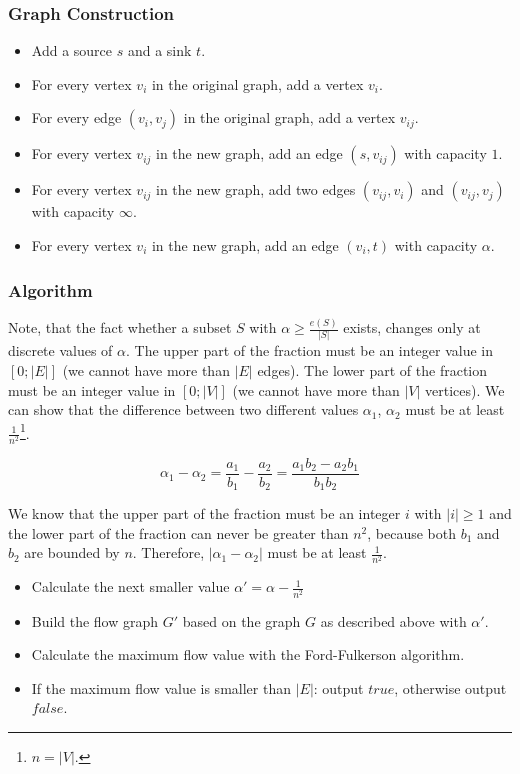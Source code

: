 \documentclass[12pt]{article}
\begin{document}
\subsubsection*{Graph Construction}
\begin{itemize}
	\item Add a source $s$ and a sink $t$.
	\item For every vertex $v_i$ in the original graph, add a vertex $v_i$.
	\item For every edge $(v_i, v_j)$ in the original graph, add a vertex $v_{ij}$.
	\item For every vertex $v_{ij}$ in the new graph, add an edge $(s, v_{ij})$ with capacity $1$.
	\item For every vertex $v_{ij}$ in the new graph, add two edges $(v_{ij}, v_i)$ and $(v_{ij}, v_j)$ with capacity $\infty$.
	\item For every vertex $v_i$ in the new graph, add an edge $(v_i, t)$ with capacity $\alpha$.
\end{itemize}

\subsubsection*{Algorithm}
Note, that the fact whether a subset $S$ with $\alpha \geq \frac{e(S)}{|S|}$ exists, changes only at discrete values of $\alpha$. The upper part of the fraction must be an integer value in $[0; |E|]$ (we cannot have more than $|E|$ edges). The lower part of the fraction must be an integer value in $[0; |V|]$ (we cannot have more than $|V|$ vertices). We can show that the difference between two different values $\alpha_1$, $\alpha_2$ must be at least $\frac{1}{n^2}$\footnote{$n = |V|$.}.

$$ \alpha_1 - \alpha_2 = \frac{a_1}{b_1} - \frac{a_2}{b_2} = \frac{a_1 b_2 - a_2 b_1}{b_1 b_2} $$

We know that the upper part of the fraction must be an integer $i$ with $|i| \geq 1$ and the lower part of the fraction can never be greater than $n^2$, because both $b_1$ and $b_2$ are bounded by $n$. Therefore, $|\alpha_1 - \alpha_2|$ must be at least $\frac{1}{n^2}$.

\begin{itemize}
	\item Calculate the next smaller value $\alpha' = \alpha - \frac{1}{n^2}$  
	\item Build the flow graph $G'$ based on the graph $G$ as described above with $\alpha'$.
	\item Calculate the maximum flow value with the Ford-Fulkerson algorithm.
	\item If the maximum flow value is smaller than $|E|$: output $\mathit{true}$, otherwise output $\mathit{false}$.
\end{itemize}
\end{document}
